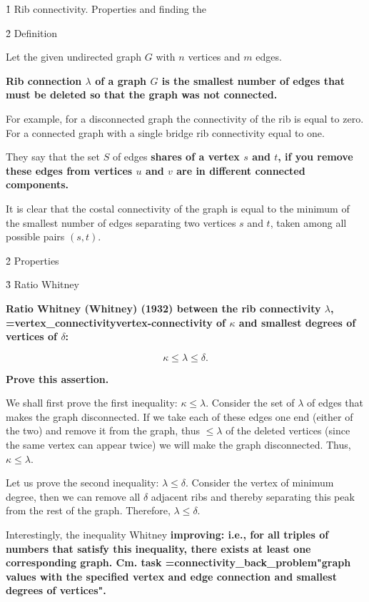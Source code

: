 \h1{ Rib connectivity. Properties and finding the }


\h2{ Definition }

Let the given undirected graph $G$ with $n$ vertices and $m$ edges.

\bf{Rib connection} $\lambda$ of a graph $G$ is the smallest number of edges that must be deleted so that the graph was not connected.

For example, for a disconnected graph the connectivity of the rib is equal to zero. For a connected graph with a single bridge rib connectivity equal to one.

They say that the set $S$ of edges \bf{shares} of a vertex $s$ and $t$, if you remove these edges from vertices $u$ and $v$ are in different connected components.

It is clear that the costal connectivity of the graph is equal to the minimum of the smallest number of edges separating two vertices $s$ and $t$, taken among all possible pairs $(s,t)$.


\h2{ Properties }


\h3{ Ratio Whitney }

\bf{Ratio Whitney (Whitney)} (1932) between the rib connectivity $\lambda$, \algohref=vertex_connectivity{vertex-connectivity} of $\kappa$ and smallest degrees of vertices of $\delta$:

$$ \kappa \le \lambda \le \delta. $$

\bf{Prove} this assertion.

We shall first prove the first inequality: $\kappa \le \lambda$. Consider the set of $\lambda$ of edges that makes the graph disconnected. If we take each of these edges one end (either of the two) and remove it from the graph, thus $\le \lambda$ of the deleted vertices (since the same vertex can appear twice) we will make the graph disconnected. Thus, $\kappa \le \lambda$.

Let us prove the second inequality: $\lambda \le \delta$. Consider the vertex of minimum degree, then we can remove all $\delta$ adjacent ribs and thereby separating this peak from the rest of the graph. Therefore, $\lambda \le \delta$.

Interestingly, the inequality Whitney \bf{improving}: i.e., for all triples of numbers that satisfy this inequality, there exists at least one corresponding graph. Cm. task \algohref=connectivity_back_problem{"graph values with the specified vertex and edge connection and smallest degrees of vertices"}.



